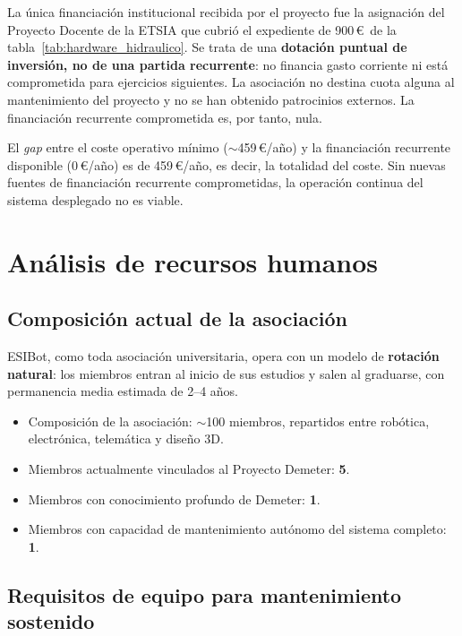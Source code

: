 La \'unica financiaci\'on institucional recibida por el proyecto fue la
asignaci\'on del Proyecto Docente de la ETSIA que cubri\'o el expediente
de 900\,\euro\ de la tabla~\ref{tab:hardware_hidraulico}. Se trata de una
\textbf{dotaci\'on puntual de inversi\'on, no de una partida recurrente}:
no financia gasto corriente ni est\'a comprometida para ejercicios
siguientes. La asociaci\'on no destina cuota alguna al mantenimiento del
proyecto y no se han obtenido patrocinios externos. La financiaci\'on
recurrente comprometida es, por tanto, nula.

\begin{conclusionbox}
El \textit{gap} entre el coste operativo m\'inimo
($\sim$459\,\euro/a\~no) y la financiaci\'on recurrente disponible
(0\,\euro/a\~no) es de 459\,\euro/a\~no, es decir, la totalidad del
coste. Sin nuevas fuentes de financiaci\'on recurrente comprometidas, la
operaci\'on continua del sistema desplegado no es viable.
\end{conclusionbox}

\section{An\'alisis de recursos humanos}
\label{sec:humanos}

\subsection{Composici\'on actual de la asociaci\'on}

ESIBot, como toda asociaci\'on universitaria, opera con un modelo de
\textbf{rotaci\'on natural}: los miembros entran al inicio de sus
estudios y salen al graduarse, con permanencia media estimada de
2--4 a\~nos.

\begin{itemize}[leftmargin=*]
    \item Composici\'on de la asociaci\'on: $\sim$100 miembros, repartidos
    entre rob\'otica, electr\'onica, telem\'atica y dise\~no 3D.
    \item Miembros actualmente vinculados al Proyecto Demeter: \textbf{5}.
    \item Miembros con conocimiento profundo de Demeter: \textbf{1}.
    \item Miembros con capacidad de mantenimiento aut\'onomo del sistema
    completo: \textbf{1}.
\end{itemize}

\subsection{Requisitos de equipo para mantenimiento sostenido}

